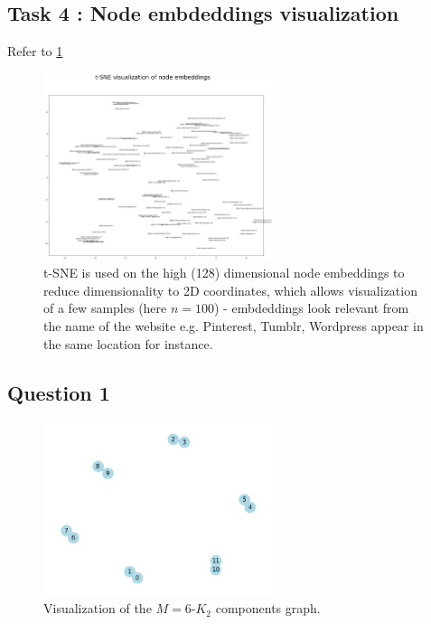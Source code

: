 \documentclass[a4paper]{article}
\begin{document}
\subsection*{Task 4 : Node embdeddings visualization}
Refer to  \ref{fig:node_embeddings}
\begin{figure}[ht]
    \centering
    \includegraphics[width=0.6\textwidth]{figures/tSNE_node_embeddings.png}
    \caption{t-SNE is used on the high (128) dimensional node embeddings to reduce dimensionality to 2D coordinates,
    which allows visualization of a few samples (here $n=100$) - embdeddings look relevant from the name of the website e.g.
    Pinterest, Tumblr, Wordpress appear in the same location for instance.}
    \label{fig:node_embeddings}
\end{figure}

\break
\subsection*{Question 1}

\begin{figure}[ht]
    \centering
    \includegraphics[width=0.6\textwidth]{figures/m_k2_graph.png}
    \caption{Visualization of the $M=6$-$K_2$ components graph.}
    \label{fig:m_k2_graph}
\end{figure}
\end{document}
